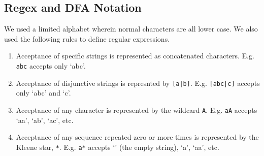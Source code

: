\documentclass[10pt,letterpaper]{article}
\begin{document}
\subsection{Regex and DFA Notation}
We used a limited alphabet wherein normal characters are all lower case. We also used the following rules to define regular expressions.
\begin{enumerate}
	\item Acceptance of specific strings is represented as concatenated characters. E.g. \verb!abc! accepts only `abc'.
	\item Acceptance of disjunctive strings is represnted by \verb![a|b]!. E.g. \verb![abc|c]! accepts only `abc' and `c'.
	\item Acceptance of any character is represented by the wildcard \verb!A!. E.g. \verb!aA! accepts `aa', `ab', `ac', etc.
	\item Acceptance of any sequence repeated zero or more times is represented by the Kleene star, \verb!*!. E.g. \verb!a*! accepts `' (the empty string), `a', `aa', etc. 
\end{enumerate}
\end{document}

